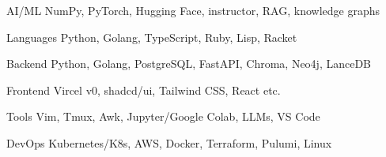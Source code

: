 

\begin{cvskills}
  \cvskill
    {AI/ML} %
    {NumPy, PyTorch, Hugging Face, instructor, RAG, knowledge graphs} %

  \cvskill
    {Languages} %
    {Python, Golang, TypeScript, Ruby, Lisp, Racket} %

  \cvskill
    {Backend} %
    {Python, Golang, PostgreSQL, FastAPI, Chroma, Neo4j, LanceDB} %

  \cvskill
    {Frontend} %
    {Vircel v0, shadcd/ui, Tailwind CSS, React etc.} %

  \cvskill
    {Tools} %
    {Vim, Tmux, Awk, Jupyter/Google Colab, LLMs, VS Code} %

  \cvskill
    {DevOps} %
    {Kubernetes/K8s, AWS, Docker, Terraform, Pulumi, Linux} %


\end{cvskills}
